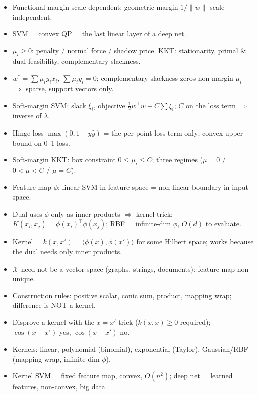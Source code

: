 \documentclass[11pt, a4paper]{article}
\begin{document}
\begin{tldrbox}
\begin{itemize}[leftmargin=*]
  \item Functional margin scale-dependent; geometric margin $1/\|w\|$ scale-independent.
  \item SVM = convex QP = the last linear layer of a deep net.
  \item $\mu_i\ge0$: penalty / normal force / shadow price. KKT: stationarity, primal \& dual feasibility, complementary slackness.
  \item $w^\ast=\sum\mu_i y_i x_i$, $\sum\mu_i y_i=0$; complementary slackness zeros non-margin $\mu_i$ $\Rightarrow$ sparse, support vectors only.
  \item Soft-margin SVM: slack $\xi_i$, objective $\tfrac12 w^\top w+C\sum\xi_i$; $C$ on the loss term $\Rightarrow$ inverse of $\lambda$.
  \item Hinge loss $\max(0,1-y\hat y)$ = the per-point loss term only; convex upper bound on 0--1 loss.
  \item Soft-margin KKT: box constraint $0\le\mu_i\le C$; three regimes ($\mu{=}0$ / $0{<}\mu{<}C$ / $\mu{=}C$).
  \item Feature map $\phi$: linear SVM in feature space = non-linear boundary in input space.
  \item Dual uses $\phi$ only as inner products $\Rightarrow$ kernel trick: $K(x_i,x_j)=\phi(x_i)^\top\phi(x_j)$; RBF = infinite-dim $\phi$, $O(d)$ to evaluate.
  \item Kernel = $k(x,x')=\langle\phi(x),\phi(x')\rangle$ for some Hilbert space; works because the dual needs only inner products.
  \item $\mathcal X$ need not be a vector space (graphs, strings, documents); feature map non-unique.
  \item Construction rules: positive scalar, conic sum, product, mapping wrap; difference is NOT a kernel.
  \item Disprove a kernel with the $x{=}x'$ trick ($k(x,x)\ge0$ required); $\cos(x{-}x')$ yes, $\cos(x{+}x')$ no.
  \item Kernels: linear, polynomial (binomial), exponential (Taylor), Gaussian/RBF (mapping wrap, infinite-dim $\phi$).
  \item Kernel SVM = fixed feature map, convex, $O(n^2)$; deep net = learned features, non-convex, big data.
\end{itemize}
\end{tldrbox}
\end{document}
